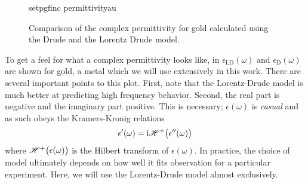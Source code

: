 \begin{figure}[ht]
\centering
{setpgfinc}
{permittivityau}
\caption{Comparison of the complex permittivity for gold calculated using the Drude
and the Lorentz Drude model.}
\label{fig:permittivityau}
\end{figure}

To get a feel for what a complex permittivity looks like, in
 $\epsilon_\mathrm{LD}(\omega)$ and
$\epsilon_\mathrm{D}(\omega)$ are shown for gold, a metal which we will use
extensively in this work.  There are several important points to this plot.
First, note that the Lorentz-Drude model is much better  at predicting high
frequency behavior.  Second, the real part is negative and the
imaginary part positive.  This is necessary; $\epsilon(\omega)$ is
\textit{casual} and as such obeys the Kramers-Kronig relations
\begin{align}
\epsilon^\prime(\omega)={\mathrm{i}} {\mathscr{H}^{+}\bigl(\epsilon^{\prime\prime}(\omega)\bigr)}
\end{align}
where ${\mathscr{H}^{+}\bigl(\epsilon(\omega)\bigr)}$ is the Hilbert transform of
$\epsilon(\omega)$.  In practice, 
the choice of model ultimately depends on how well it fits observation for
a particular experiment.  Here, we will use the Lorentz-Drude model almost
exclusively.

